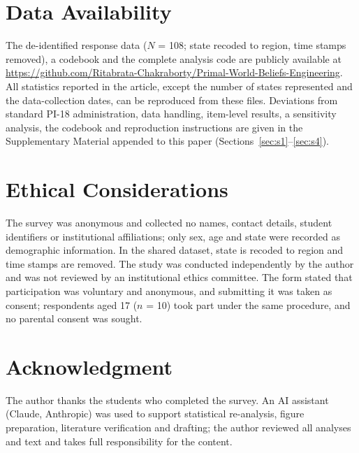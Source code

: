 \documentclass[journal,a4paper]{IEEEtran}
\begin{document}
\section*{Data Availability}
The de-identified response data ($N$ = 108; state recoded to region, time stamps removed), a codebook and the complete analysis code are publicly available at \url{https://github.com/Ritabrata-Chakraborty/Primal-World-Beliefs-Engineering}. All statistics reported in the article, except the number of states represented and the data-collection dates, can be reproduced from these files. Deviations from standard PI-18 administration, data handling, item-level results, a sensitivity analysis, the codebook and reproduction instructions are given in the Supplementary Material appended to this paper (Sections~\ref{sec:s1}--\ref{sec:s4}).

\section*{Ethical Considerations}
The survey was anonymous and collected no names, contact details, student identifiers or institutional affiliations; only sex, age and state were recorded as demographic information. In the shared dataset, state is recoded to region and time stamps are removed. The study was conducted independently by the author and was not reviewed by an institutional ethics committee. The form stated that participation was voluntary and anonymous, and submitting it was taken as consent; respondents aged 17 ($n$ = 10) took part under the same procedure, and no parental consent was sought.

\section*{Acknowledgment}
The author thanks the students who completed the survey. An AI assistant (Claude, Anthropic) was used to support statistical re-analysis, figure preparation, literature verification and drafting; the author reviewed all analyses and text and takes full responsibility for the content.
\end{document}
